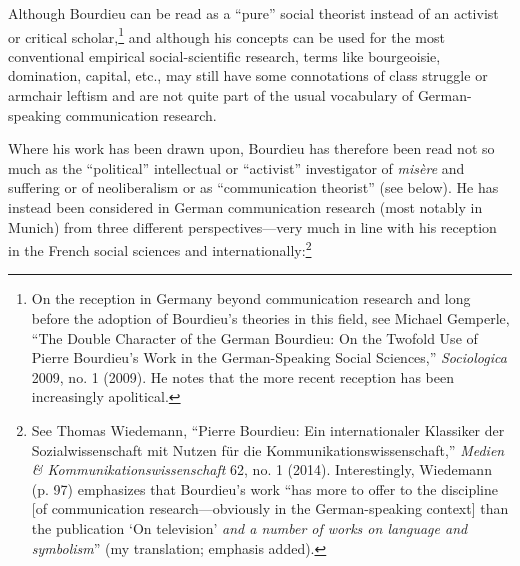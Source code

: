 \documentclass{tufte-handout}
\begin{document}
Although Bourdieu can be read as a ``pure'' social theorist instead of
an activist or critical scholar,\footnote{On the reception in Germany
  beyond communication research and long before the adoption of
  Bourdieu's theories in this field, see Michael Gemperle, ``The Double
  Character of the German Bourdieu: On the Twofold Use of Pierre
  Bourdieu's Work in the German-Speaking Social Sciences,''
  \emph{Sociologica} 2009, no. 1 (2009). He notes that the more recent
  reception has been increasingly apolitical.} and although his concepts
can be used for the most conventional empirical social-scientific
research, terms like bourgeoisie, domination, capital, etc., may still
have some connotations of class struggle or armchair leftism and are not
quite part of the usual vocabulary of German-speaking communication
research.

Where his work has been drawn upon, Bourdieu has therefore been read not
so much as the ``political'' intellectual or ``activist'' investigator
of \emph{misère} and suffering or of neoliberalism or as ``communication
theorist'' (see below). He has instead been considered in German
communication research (most notably in Munich) from three different
perspectives---very much in line with his reception in the French social
sciences and internationally:\footnote{See Thomas Wiedemann, ``Pierre
  Bourdieu: Ein internationaler Klassiker der Sozialwissenschaft mit
  Nutzen für die Kommunikationswissenschaft,'' \emph{Medien \&
  Kommunikationswissenschaft} 62, no. 1 (2014). Interestingly, Wiedemann
  (p. 97) emphasizes that Bourdieu's work ``has more to offer to the
  discipline {[}of communication research---obviously in the
  German-speaking context{]} than the publication `On television'
  \emph{and a number of works on language and symbolism}'' (my
  translation; emphasis added).}
\end{document}
